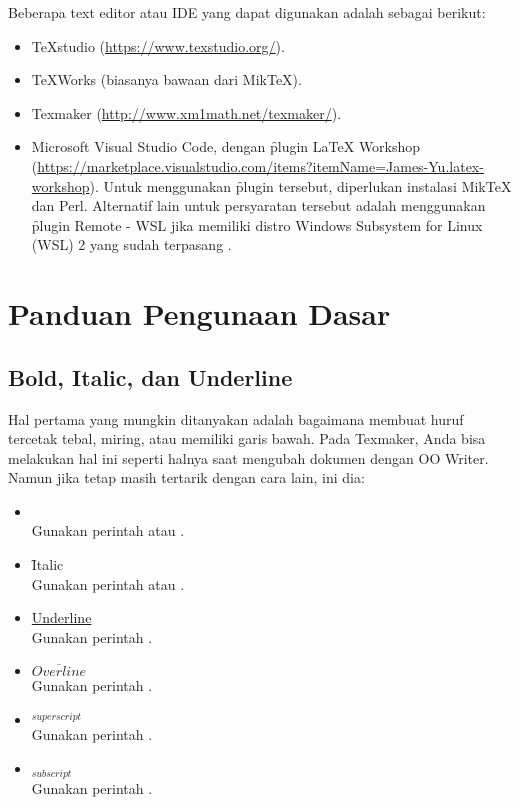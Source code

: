 Beberapa text editor atau IDE yang dapat digunakan adalah sebagai berikut:
\begin{itemize}
	\item TeXstudio (\url{https://www.texstudio.org/}).
	\item TeXWorks (biasanya bawaan dari MikTeX).
	\item Texmaker (\url{http://www.xm1math.net/texmaker/}).
	\item Microsoft Visual Studio Code, dengan \f{plugin} LaTeX Workshop (\url{https://marketplace.visualstudio.com/items?itemName=James-Yu.latex-workshop}).
	Untuk menggunakan \f{plugin} tersebut, diperlukan instalasi MikTeX dan Perl.
	Alternatif lain untuk persyaratan tersebut adalah menggunakan \f{plugin} Remote - WSL jika memiliki distro Windows Subsystem for Linux (WSL) 2 yang sudah terpasang .
\end{itemize}


\section{Panduan Pengunaan Dasar \latex}
\label{sec:latexUsage}

\subsection{Bold, Italic, dan Underline}
\label{sec:latexBIU}
Hal pertama yang mungkin ditanyakan adalah bagaimana membuat huruf tercetak tebal, miring, atau memiliki garis bawah.
Pada Texmaker, Anda bisa melakukan hal ini seperti halnya saat mengubah dokumen dengan OO Writer.
Namun jika tetap masih tertarik dengan cara lain, ini dia:

\begin{itemize}
	\item {} \\
	Gunakan perintah  atau
	.
	\item \f{Italic} \\
	Gunakan perintah  atau
	.
	\item \underline{Underline} \\
	Gunakan perintah .
	\item $\overline{Overline}$ \\
	Gunakan perintah .
	\item $^{superscript}$ \\
	Gunakan perintah \code{\bslash{}$\lbrace\rbrace$}.
	\item $_{subscript}$ \\
	Gunakan perintah \code{\bslash{}\_$\lbrace\rbrace$}.
\end{itemize}

